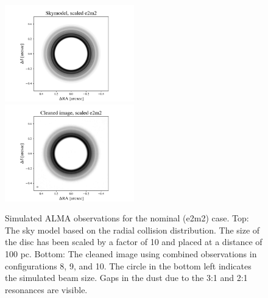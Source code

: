 \documentclass[fleqn,usenatbib]{mnras}
\begin{document}
\begin{figure}
\begin{center}
    \includegraphics[width=0.5\textwidth]{alma/skymodel_e2m2.png}
    \includegraphics[width=0.5\textwidth]{alma/xy_e2m2.png}
    \caption{Simulated ALMA observations for the nominal (e2m2) case.  Top: The sky model based on the radial collision distribution. The size of the disc has been scaled by a factor of 10 and placed at  a distance of 100 pc. Bottom: The cleaned image using combined observations in configurations 8, 9, and 10. The circle in the bottom left indicates the simulated beam size. Gaps in the dust due to the 3:1 and 2:1 resonances are visible. \label{fig:alma_sim_obs}}
\end{center}
\end{figure}
\end{document}
